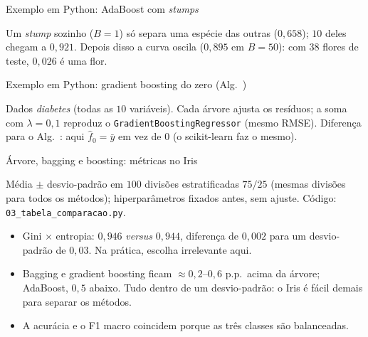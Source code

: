 \begin{frame}[fragile]{Exemplo em Python: AdaBoost com \emph{stumps}}


\vspace{2pt}
{\small Um \emph{stump} sozinho ($B=1$) só separa uma espécie das outras ($0{,}658$); $10$ deles chegam a $0{,}921$. Depois disso a curva oscila ($0{,}895$ em $B=50$): com $38$ flores de teste, $0{,}026$ é \alert{uma} flor.}
\end{frame}

\begin{frame}[fragile]{Exemplo em Python: gradient boosting do zero (Alg.~\aGB)}

\vspace{3pt}

\vspace{2pt}
{\small Dados \emph{diabetes} (todas as $10$ variáveis). Cada árvore ajusta os \alert{resíduos}; a soma com $\lambda=0{,}1$ reproduz o \texttt{GradientBoostingRegressor} (mesmo RMSE). Diferença para o Alg.~\aGB: aqui $\hat f_0=\bar y$ em vez de $0$ (o scikit-learn faz o mesmo).}
\end{frame}

\begin{frame}{Árvore, bagging e boosting: métricas no Iris}
\centering
\small


\vspace{4pt}
\raggedright
{\footnotesize Média $\pm$ desvio-padrão em $100$ divisões estratificadas $75/25$ (mesmas divisões para todos os métodos); hiperparâmetros fixados antes, sem ajuste. Código: \texttt{03\_tabela\_comparacao.py}.}
\begin{itemize}
  \item \alert{Gini $\times$ entropia}: $0{,}946$ \emph{versus} $0{,}944$, diferença de $0{,}002$ para um desvio-padrão de $0{,}03$. Na prática, escolha irrelevante aqui.
  \item Bagging e gradient boosting ficam $\approx0{,}2$--$0{,}6$ p.p.\ acima da árvore; AdaBoost, $0{,}5$ abaixo. Tudo \alert{dentro de um desvio-padrão}: o Iris é fácil demais para separar os métodos.
  \item A acurácia e o F1 macro coincidem porque as três classes são balanceadas.
\end{itemize}
\end{frame}

